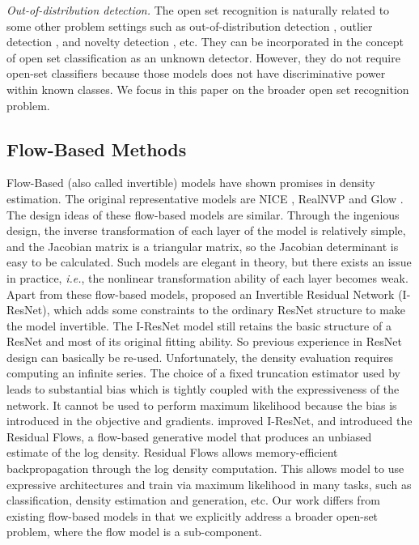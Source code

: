 \documentclass[runningheads]{llncs}
\begin{document}
\textit{Out-of-distribution detection.} The open set recognition is naturally related to some other problem settings such as out-of-distribution detection \cite{vernekar2019out,joan2019likelihood,lee2017training}, outlier detection \cite{ruff2018deep}, and novelty detection \cite{perera2019ocgan}, etc. They can be incorporated in the concept of open set classification as an unknown detector. However, they do not require open-set classifiers because those models does not have discriminative power within known classes. We focus in this paper on the broader open set recognition problem.

\subsection{Flow-Based Methods}
Flow-Based (also called invertible) models have shown promises in density estimation. The original representative models are NICE \cite{dinh2014nice}, RealNVP \cite{dinh2016density} and Glow \cite{kingma2018glow}. The design ideas of these flow-based models are similar. Through the ingenious design, the inverse transformation of each layer of the model is relatively simple, and the Jacobian matrix is a triangular matrix, so the Jacobian determinant is easy to be calculated. Such models are elegant in theory, but there exists an issue in practice, \textit{i.e.}, the nonlinear transformation ability of each layer becomes weak. Apart from these flow-based models, \cite{behrmann2018invertible} proposed an Invertible Residual Network (I-ResNet), which adds some constraints to the ordinary ResNet structure to make the model invertible. The I-ResNet model still retains the basic structure of a ResNet and most of its original fitting ability. So previous experience in ResNet design can basically be re-used. Unfortunately, the density evaluation requires computing an infinite series. The choice of a fixed truncation estimator used by \cite{behrmann2018invertible} leads to substantial bias which is tightly coupled with the expressiveness of the network. It cannot be used to perform maximum likelihood because the bias is introduced in the objective and gradients. \cite{chen2019residual} improved I-ResNet, and introduced the Residual Flows, a flow-based generative model that produces an unbiased estimate of the log density. Residual Flows allows memory-efficient backpropagation through the log density computation. This allows model to use expressive architectures and train via maximum likelihood in many tasks, such as classification, density estimation and generation, etc. Our work differs from existing flow-based models in that we explicitly address a broader open-set problem, where the flow model is a sub-component.
\end{document}
